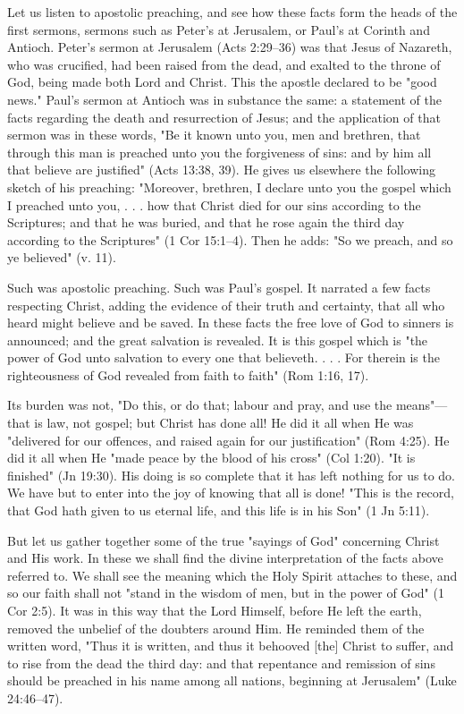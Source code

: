 \documentclass[
]{book}
\begin{document}
Let us listen to apostolic preaching, and see how these facts form the heads of the first sermons, sermons such as Peter's at Jerusalem, or Paul's at Corinth and Antioch. Peter's sermon at Jerusalem (Acts 2:29--36) was that Jesus of Nazareth, who was crucified, had been raised from the dead, and exalted to the throne of God, being made both Lord and Christ. This the apostle declared to be "good news." Paul's sermon at Antioch was in substance the same: a statement of the facts regarding the death and resurrection of Jesus; and the application of that sermon was in these words, "Be it known unto you, men and brethren, that through this man is preached unto you the forgiveness of sins: and by him all that believe are justified" (Acts 13:38, 39). He gives us elsewhere the following sketch of his preaching: "Moreover, brethren, I declare unto you the gospel which I preached unto you, . . . how that Christ died for our sins according to the Scriptures; and that he was buried, and that he rose again the third day according to the Scriptures" (1 Cor 15:1--4). Then he adds: "So we preach, and so ye believed" (v. 11).

Such was apostolic preaching. Such was Paul's gospel. It narrated a few facts respecting Christ, adding the evidence of their truth and certainty, that all who heard might believe and be saved. In these facts the free love of God to sinners is announced; and the great salvation is revealed. It is this gospel which is "the power of God unto salvation to every one that believeth. . . . For therein is the righteousness of God revealed from faith to faith" (Rom 1:16, 17).

Its burden was not, "Do this, or do that; labour and pray, and use the means"---that is law, not gospel; but Christ has done all! He did it all when He was "delivered for our offences, and raised again for our justification" (Rom 4:25). He did it all when He "made peace by the blood of his cross" (Col 1:20). "It is finished" (Jn 19:30). His doing is so complete that it has left nothing for us to do. We have but to enter into the joy of knowing that all is done! "This is the record, that God hath given to us eternal life, and this life is in his Son" (1 Jn 5:11).

But let us gather together some of the true "sayings of God" concerning Christ and His work. In these we shall find the divine interpretation of the facts above referred to. We shall see the meaning which the Holy Spirit attaches to these, and so our faith shall not "stand in the wisdom of men, but in the power of God" (1 Cor 2:5). It was in this way that the Lord Himself, before He left the earth, removed the unbelief of the doubters around Him. He reminded them of the written word, "Thus it is written, and thus it behooved {[}the{]} Christ to suffer, and to rise from the dead the third day: and that repentance and remission of sins should be preached in his name among all nations, beginning at Jerusalem" (Luke 24:46--47).
\end{document}
